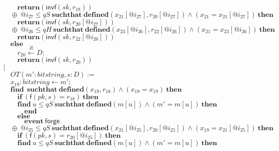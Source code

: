 \documentclass{article}
\newcommand{\store}{\leftarrow}
\newcommand{\getR}{\stackrel{R}{\store}}
\newcommand{\kw}[1]{\mathbf{#1}}
\newcommand{\kwf}[1]{\mathsf{#1}}
\newcommand{\var}[1]{\mathit{#1}}
\newcommand{\kwt}[1]{\mathit{#1}}
\newcommand{\kwp}[1]{\mathit{#1}}
\begin{document}
\begin{tabbing}
$\quad \quad \quad \kw{return}\kwf{}(\kwf{invf}(\var{sk}, \var{r}_{18}))$\\
$\quad \quad \oplus\ \var{@i}_{27} \leq \kwp{qS}\ \kw{suchthat}\ \kw{defined}(\var{x}_{21}[\var{@i}_{27}], \var{r}_{20}[\var{@i}_{27}])\wedge (\var{x}_{21}  =  \var{x}_{21}[\var{@i}_{27}])\ \kw{then}$\\
$\quad \quad \quad \kw{return}\kwf{}(\kwf{invf}(\var{sk}, \var{r}_{20}[\var{@i}_{27}]))$\\
$\quad \quad \oplus\ \var{@i}_{26} \leq \kwp{qH}\ \kw{suchthat}\ \kw{defined}(\var{x}_{23}[\var{@i}_{26}], \var{r}_{22}[\var{@i}_{26}])\wedge (\var{x}_{21}  =  \var{x}_{23}[\var{@i}_{26}])\ \kw{then}$\\
$\quad \quad \quad \kw{return}\kwf{}(\kwf{invf}(\var{sk}, \var{r}_{22}[\var{@i}_{26}]))$\\
$\quad \quad \kw{else}$\\
$\quad \quad \quad \var{r}_{20} \getR \kwt{D};$\\
$\quad \quad \quad \kw{return}\kwf{}(\kwf{invf}(\var{sk}, \var{r}_{20}))$\\
$\quad |$\\
$\quad \quad OT(\var{m'}: \kwt{bitstring}, \var{s}: \kwt{D}) :=$\\
$\quad \quad \var{x}_{19}: \kwt{bitstring} \store \var{m'};$\\
$\quad \quad \kw{find}\ \ \kw{suchthat}\ \kw{defined}(\var{x}_{19}, \var{r}_{18})\wedge (\var{x}_{19}  =  \var{x}_{19})\ \kw{then}$\\
$\quad \quad \quad \kw{if}\ (\kwf{f}(\var{pk}, \var{s})  =  \var{r}_{18})\ \kw{then}$\\
$\quad \quad \quad \kw{find}\ \var{u} \leq \kwp{qS}\ \kw{suchthat}\ \kw{defined}(\var{m}[\var{u}])\wedge (\var{m'}  =  \var{m}[\var{u}])\ \kw{then}$\\
$\quad \quad \quad \quad \kw{end}$\\
$\quad \quad \quad \kw{else}$\\
$\quad \quad \quad \quad \kw{event}\ \kwf{forge}$\\
$\quad \quad \oplus\ \var{@i}_{25} \leq \kwp{qS}\ \kw{suchthat}\ \kw{defined}(\var{x}_{21}[\var{@i}_{25}], \var{r}_{20}[\var{@i}_{25}])\wedge (\var{x}_{19}  =  \var{x}_{21}[\var{@i}_{25}])\ \kw{then}$\\
$\quad \quad \quad \kw{if}\ (\kwf{f}(\var{pk}, \var{s})  =  \var{r}_{20}[\var{@i}_{25}])\ \kw{then}$\\
$\quad \quad \quad \kw{find}\ \var{u} \leq \kwp{qS}\ \kw{suchthat}\ \kw{defined}(\var{m}[\var{u}])\wedge (\var{m'}  =  \var{m}[\var{u}])\ \kw{then}$\\

\end{tabbing}
\end{document}
